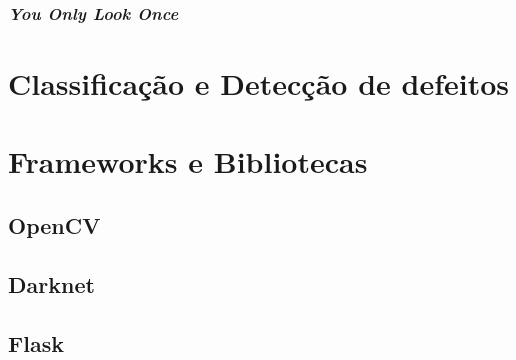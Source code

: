 

\subsubsection{\textit{You Only Look Once}} \label{cap:fund-ia-rn-conv}
\section{Classificação e Detecção de defeitos} \label{cap:fund-frameworks}
\section{Frameworks e Bibliotecas} \label{cap:fund-frameworks}
\subsection{OpenCV} \label{cap:fund-frameworks-opencv}
\subsection{Darknet} \label{cap:fund-frameworks-darknet}
\subsection{Flask} \label{cap:fund-frameworks-flask}
